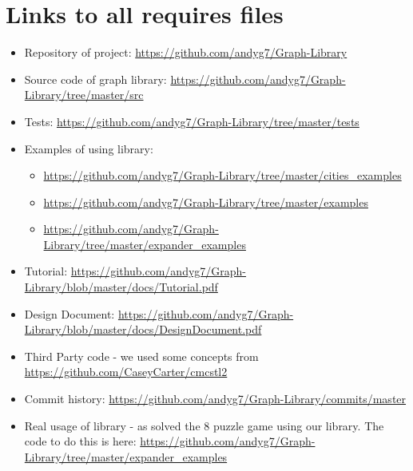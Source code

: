 \documentclass{article}
\begin{document}
\section{Links to all requires files}
\begin{itemize}
\item Repository of project: \url{https://github.com/andyg7/Graph-Library}
\item Source code of graph library: \url{https://github.com/andyg7/Graph-Library/tree/master/src}
\item Tests: \url{https://github.com/andyg7/Graph-Library/tree/master/tests}
\item Examples of using library:
\begin{itemize}
\item \url{https://github.com/andyg7/Graph-Library/tree/master/cities_examples}
\item \url{https://github.com/andyg7/Graph-Library/tree/master/examples}
\item \url{https://github.com/andyg7/Graph-Library/tree/master/expander_examples}
\end{itemize}
\item Tutorial: \url{https://github.com/andyg7/Graph-Library/blob/master/docs/Tutorial.pdf}
\item Design Document: \url{https://github.com/andyg7/Graph-Library/blob/master/docs/DesignDocument.pdf}
\item Third Party code - we used some concepts from \url{https://github.com/CaseyCarter/cmcstl2}
\item Commit history: \url{https://github.com/andyg7/Graph-Library/commits/master}
\item Real usage of library - as solved the 8 puzzle game using our library. The code to do this is here:  \url{https://github.com/andyg7/Graph-Library/tree/master/expander_examples}
\end{itemize}
\end{document}
